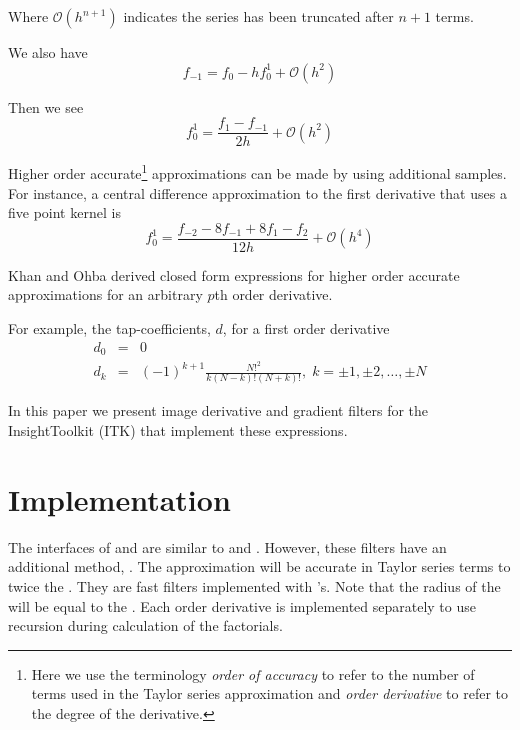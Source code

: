 \documentclass{InsightArticle}
\begin{document}
Where $\mathcal{O}(h^{n+1})$ indicates the series has been truncated after $n+1$
terms.

We also have
\begin{equation}
  f_{-1} = f_0 - h f^1_0 + \mathcal{O}(h^{2})
\end{equation}

Then we see
\begin{equation}
  f^1_0 = \frac{f_1 - f_{-1}} { 2 h } + \mathcal{O}(h^{2})
\end{equation}

Higher order accurate\footnote{Here we use the terminology \textit{order of
accuracy} to refer to the number of terms used in the Taylor series
approximation and \textit{order derivative} to refer to the degree of the
derivative.} approximations can be made by using additional samples.
For instance, a central difference approximation to the first derivative that uses a
five point kernel is
\begin{equation}
  f^1_0 = \frac{f_{-2} - 8 f_{-1} + 8 f_1 - f_2}{ 12 h } + \mathcal{O}(h^4)
\end{equation}

Khan and Ohba derived closed form expressions for higher order accurate
approximations for an arbitrary $p$th order derivative\cite{Khan1999,Khan2003}.

For example, the tap-coefficients, $d$, for a first order derivative 
\begin{eqnarray}
d_0 & = & 0 \\
d_k & = & (-1)^{k+1} \frac{N!^2}{k(N-k)!(N+k)!}, \; k = \pm 1, \pm 2, \dots, \pm
N
\end{eqnarray}

In this paper we present image derivative and gradient filters for the
InsightToolkit (ITK)\cite{itk} that implement these expressions.

\section{Implementation}

The interfaces of  and
 are similar to
 and .  However,
these filters have an additional method, .  The
approximation will be accurate in Taylor series terms to twice the
.  They are fast filters implemented with
's.  Note that the radius of the
 will be equal to the .
Each order derivative is implemented separately to use recursion during
calculation of the factorials\cite{Khan1999}.
\end{document}
